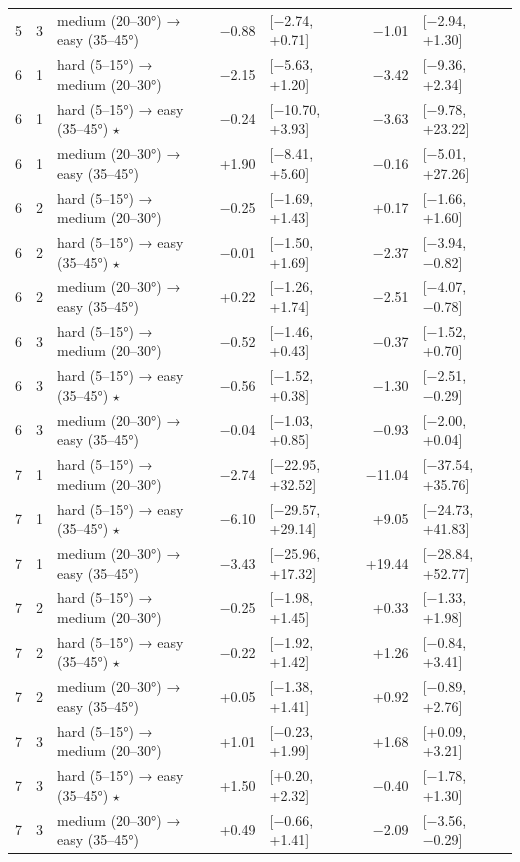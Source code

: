 \begin{table}[htbp]
\begin{tabular}{rllrlrl}
    5 & 3 & medium (20–30°) → easy (35–45°) & −0.88 & [−2.74, +0.71] & −1.01 & [−2.94, +1.30] \\
    6 & 1 & hard (5–15°) → medium (20–30°) & −2.15 & [−5.63, +1.20] & −3.42 & [−9.36, +2.34] \\
    6 & 1 & hard (5–15°) → easy (35–45°) $\star$ & −0.24 & [−10.70, +3.93] & −3.63 & [−9.78, +23.22] \\
    6 & 1 & medium (20–30°) → easy (35–45°) & +1.90 & [−8.41, +5.60] & −0.16 & [−5.01, +27.26] \\
    6 & 2 & hard (5–15°) → medium (20–30°) & −0.25 & [−1.69, +1.43] & +0.17 & [−1.66, +1.60] \\
    6 & 2 & hard (5–15°) → easy (35–45°) $\star$ & −0.01 & [−1.50, +1.69] & −2.37 & [−3.94, −0.82] \\
    6 & 2 & medium (20–30°) → easy (35–45°) & +0.22 & [−1.26, +1.74] & −2.51 & [−4.07, −0.78] \\
    6 & 3 & hard (5–15°) → medium (20–30°) & −0.52 & [−1.46, +0.43] & −0.37 & [−1.52, +0.70] \\
    6 & 3 & hard (5–15°) → easy (35–45°) $\star$ & −0.56 & [−1.52, +0.38] & −1.30 & [−2.51, −0.29] \\
    6 & 3 & medium (20–30°) → easy (35–45°) & −0.04 & [−1.03, +0.85] & −0.93 & [−2.00, +0.04] \\
    7 & 1 & hard (5–15°) → medium (20–30°) & −2.74 & [−22.95, +32.52] & −11.04 & [−37.54, +35.76] \\
    7 & 1 & hard (5–15°) → easy (35–45°) $\star$ & −6.10 & [−29.57, +29.14] & +9.05 & [−24.73, +41.83] \\
    7 & 1 & medium (20–30°) → easy (35–45°) & −3.43 & [−25.96, +17.32] & +19.44 & [−28.84, +52.77] \\
    7 & 2 & hard (5–15°) → medium (20–30°) & −0.25 & [−1.98, +1.45] & +0.33 & [−1.33, +1.98] \\
    7 & 2 & hard (5–15°) → easy (35–45°) $\star$ & −0.22 & [−1.92, +1.42] & +1.26 & [−0.84, +3.41] \\
    7 & 2 & medium (20–30°) → easy (35–45°) & +0.05 & [−1.38, +1.41] & +0.92 & [−0.89, +2.76] \\
    7 & 3 & hard (5–15°) → medium (20–30°) & +1.01 & [−0.23, +1.99] & +1.68 & [+0.09, +3.21] \\
    7 & 3 & hard (5–15°) → easy (35–45°) $\star$ & +1.50 & [+0.20, +2.32] & −0.40 & [−1.78, +1.30] \\
    7 & 3 & medium (20–30°) → easy (35–45°) & +0.49 & [−0.66, +1.41] & −2.09 & [−3.56, −0.29] \\

\end{tabular}
\end{table}
